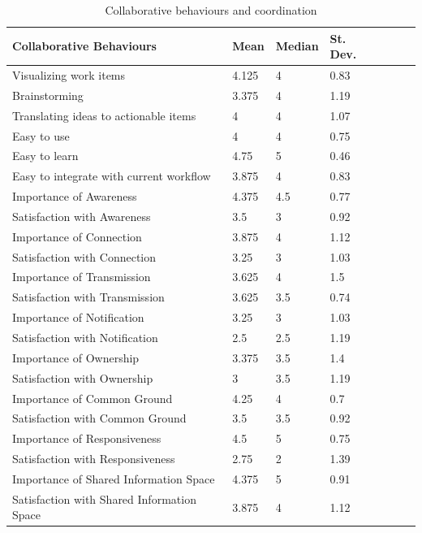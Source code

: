 \documentclass[conference]{IEEEtran}
\begin{document}
\begin{table}[t]
\begin{center}
\begin{tabular}{@{\hspace{.2cm}}llll@{\hspace{.2cm}}c@{\hspace{.2cm}}c@{\hspace{.2cm}}c@{\hspace{.2cm}}}
\hline
Collaborative Behaviours&  Mean&   Median&  St. Dev.&\\
\hline
Visualizing work items& 4.125& 4& 0.83\\
Brainstorming& 3.375& 4& 1.19\\
Translating ideas to actionable items& 4& 4& 1.07\\
Easy to use& 4& 4& 0.75\\
Easy to learn& 4.75& 5& 0.46\\
Easy to integrate with current workflow& 3.875& 4& 0.83\\
\hline
Importance of Awareness& 4.375& 4.5& 0.77\\
Satisfaction with Awareness& 3.5& 3& 0.92\\
\hline
Importance of Connection& 3.875& 4& 1.12\\
Satisfaction with Connection& 3.25& 3& 1.03\\
\hline
Importance of Transmission& 3.625& 4& 1.5\\
Satisfaction with Transmission& 3.625& 3.5& 0.74\\
\hline
Importance of Notification& 3.25& 3& 1.03\\
Satisfaction with Notification& 2.5& 2.5& 1.19\\
\hline
Importance of Ownership& 3.375& 3.5& 1.4\\
Satisfaction with Ownership& 3& 3.5& 1.19\\
\hline
Importance of Common Ground& 4.25& 4& 0.7\\
Satisfaction with Common Ground& 3.5& 3.5& 0.92\\
\hline
Importance of Responsiveness& 4.5& 5& 0.75\\
Satisfaction with Responsiveness& 2.75& 2& 1.39\\
\hline
Importance of Shared Information Space& 4.375& 5& 0.91\\
Satisfaction with Shared Information Space& 3.875& 4& 1.12\\
\hline
\end{tabular}
\end{center}
\caption{Collaborative behaviours and coordination}
\label{tab:surveyresults}
\end{table}
\end{document}

